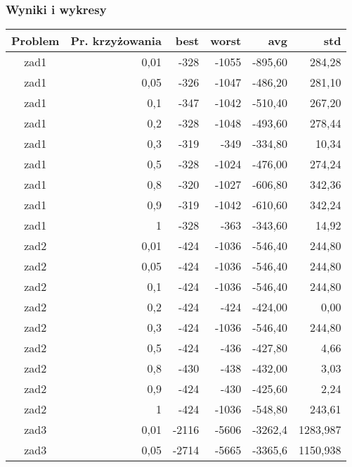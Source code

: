 \documentclass[12pt,a4paper]{article}
\begin{document}
\subsubsection{Wyniki i wykresy}
\begin{table}[htbp]
  \centering
    \begin{tabular}{crrrrr}
    \multicolumn{1}{p{4.215em}}{\textbf{Problem}} & \multicolumn{1}{p{6.645em}}{\textbf{Pr. krzyżowania}} & \multicolumn{1}{p{4.215em}}{\textbf{best}} & \multicolumn{1}{p{4.215em}}{\textbf{worst}} & \multicolumn{1}{p{4.215em}}{\textbf{avg}} & \multicolumn{1}{p{4.215em}}{\textbf{std}} \\
    \midrule
    zad1  & 0,01  & -328  & -1055 & -895,60 & 284,28 \\
    zad1  & 0,05  & -326  & -1047 & -486,20 & 281,10 \\
    zad1  & 0,1   & -347  & -1042 & -510,40 & 267,20 \\
    zad1  & 0,2   & -328  & -1048 & -493,60 & 278,44 \\
    zad1  & 0,3   & -319  & -349  & -334,80 & 10,34 \\
    zad1  & 0,5   & -328  & -1024 & -476,00 & 274,24 \\
    zad1  & 0,8   & -320  & -1027 & -606,80 & 342,36 \\
    zad1  & 0,9   & -319  & -1042 & -610,60 & 342,24 \\
    zad1  & 1     & -328  & -363  & -343,60 & 14,92 \\
    \midrule
    zad2  & 0,01  & -424  & -1036 & -546,40 & 244,80 \\
    zad2  & 0,05  & -424  & -1036 & -546,40 & 244,80 \\
    zad2  & 0,1   & -424  & -1036 & -546,40 & 244,80 \\
    zad2  & 0,2   & -424  & -424  & -424,00 & 0,00 \\
    zad2  & 0,3   & -424  & -1036 & -546,40 & 244,80 \\
    zad2  & 0,5   & -424  & -436  & -427,80 & 4,66 \\
    zad2  & 0,8   & -430  & -438  & -432,00 & 3,03 \\
    zad2  & 0,9   & -424  & -430  & -425,60 & 2,24 \\
    zad2  & 1     & -424  & -1036 & -548,80 & 243,61 \\
    \midrule
    zad3  & 0,01  & -2116 & -5606 & -3262,4 & 1283,987 \\
    zad3  & 0,05  & -2714 & -5665 & -3365,6 & 1150,938 \\

\end{tabular}
\end{table}
\end{document}
